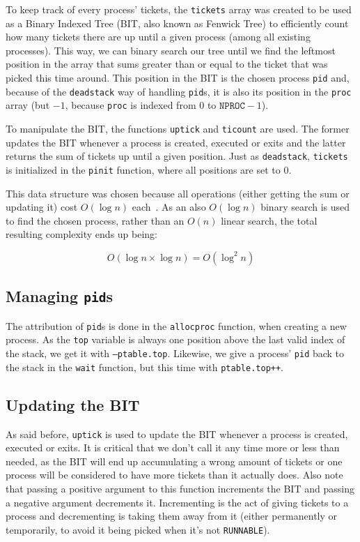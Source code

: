 \documentclass[12pt]{article}
\begin{document}
To keep track of every process' tickets, the \texttt{tickets} array was created to be used as a Binary Indexed Tree (BIT, also known as Fenwick Tree) to efficiently count how many tickets there are up until a given process (among all existing processes). This way, we can binary search our tree until we find the leftmost position in the array that sums greater than or equal to the ticket that was picked this time around. This position in the BIT is the chosen process \texttt{pid} and, because of the \texttt{deadstack} way of handling \texttt{pid}s, it is also its position in the \texttt{proc} array (but $- 1$, because \texttt{proc} is indexed from 0 to $\texttt{NPROC} - 1$).

To manipulate the BIT, the functions \texttt{uptick} and \texttt{ticount} are used. The former updates the BIT whenever a process is created, executed or exits and the latter returns the sum of tickets up until a given position. Just as \texttt{deadstack}, \texttt{tickets} is initialized in the \texttt{pinit} function, where all positions are set to 0.

This data structure was chosen because all operations (either getting the sum or updating it) cost $O(\log n)$ each~\cite{halim:13}. As an also $O(\log n)$ binary search is used to find the chosen process, rather than an $O(n)$ linear search, the total resulting complexity ends up being:

$$O(\log n \times \log n) = O(\log^2 n)$$

\subsection{Managing \texttt{pid}s}
The attribution of \texttt{pid}s is done in the \texttt{allocproc} function, when creating a new process. As the \texttt{top} variable is always one position above the last valid index of the stack, we get it with \texttt{--ptable.top}. Likewise, we give a process' \texttt{pid} back to the stack in the \texttt{wait} function, but this time with \texttt{ptable.top++}.

\subsection{Updating the BIT}
As said before, \texttt{uptick} is used to update the BIT whenever a process is created, executed or exits. It is critical that we don't call it any time more or less than needed, as the BIT will end up accumulating a wrong amount of tickets or one process will be considered to have more tickets than it actually does. Also note that passing a positive argument to this function increments the BIT and passing a negative argument decrements it. Incrementing is the act of giving tickets to a process and decrementing is taking them away from it (either permanently or temporarily, to avoid it being picked when it's not \texttt{RUNNABLE}).
\end{document}
